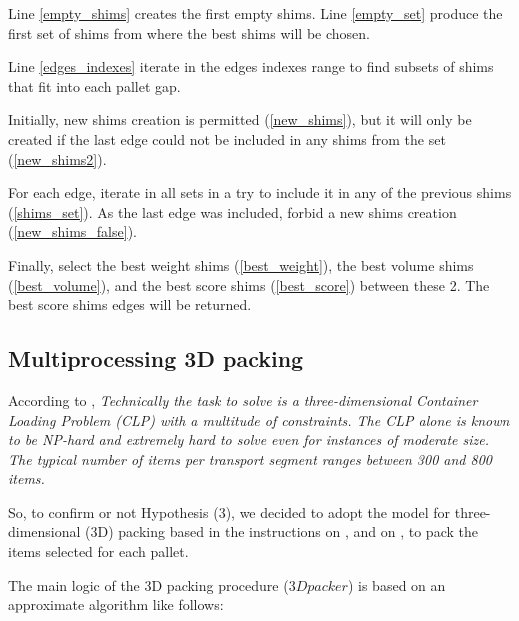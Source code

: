 \documentclass[preprint,authoryear]{elsarticle}
\begin{document}
Line \ref{empty_shims} creates the first empty shims.
Line \ref{empty_set} produce the first set of shims from where the best shims will be chosen.

Line \ref{edges_indexes} iterate in the edges indexes range to find subsets of shims that fit into each pallet gap.

Initially, new shims creation is permitted (\ref{new_shims}), but it will only be created if the last edge could not be included in any shims from the set (\ref{new_shims2}). 

For each edge, iterate in all sets in a try to include it in any of the previous shims (\ref{shims_set}).
As the last edge was included, forbid a new shims creation (\ref{new_shims_false}).

Finally, select the best weight shims (\ref{best_weight}), the best volume shims (\ref{best_volume}), and the best score shims (\ref{best_score}) between these 2. The best score shims edges will be returned.


\subsection{Multiprocessing 3D packing}

According to \cite{BrandtStefan2019}, {\it Technically the task to solve is a three-dimensional Container Loading Problem (CLP) with a multitude of constraints. The CLP alone is known to be NP-hard and extremely hard to solve even for instances of moderate size. The typical number of items per transport segment ranges between 300 and 800 items.}

So, to confirm or not Hypothesis (3), we decided to adopt the model for three-dimensional (3D) packing based in the instructions on \cite{DubeKanavathy2006}, \cite{li2014} and on \cite{PaquayLimbourgSchynsOliveira2018}, to pack the items selected for each pallet.

The main logic of the 3D packing procedure ($3Dpacker$) is based on an approximate algorithm like follows:
\end{document}
